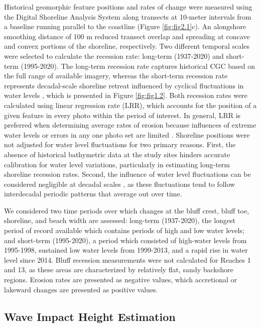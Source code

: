 Historical geomorphic feature positions and rates of change were measured using
the Digital Shoreline Analysis System
\citep[DSAS,][]{thieler2005digital,thieler2009digital,himmelstoss2021digital}
along transects at 10-meter intervals from a baseline running parallel to the
coastline (Figure \ref{fig:fig2.1}c). An alongshore smoothing distance of 100 m
reduced transect overlap and spreading at concave and convex portions of the
shoreline, respectively. Two different temporal scales were selected to
calculate the recession rate: long-term (1937-2020) and short-term (1995-2020).
The long-term recession rate captures historical CGC based on the full range of
available imagery, whereas the short-term recession rate represents
decadal-scale shoreline retreat influenced by cyclical fluctuations in water
levels , which is presented in Figure \ref{fig:fig1.2}. Both recession rates
were calculated using linear regression rate (LRR), which accounts for the
position of a given feature in every photo within the period of interest. In
general, LRR is preferred when determining average rates of erosion because
influences of extreme water levels or errors in any one photo set are limited
\citep{thieler2005digital,thieler2009digital,himmelstoss2021digital}. Shoreline
positions were not adjusted for water level fluctuations for two primary
reasons. First, the absence of historical bathymetric data at the study sites
hinders accurate calibration for water level variations, particularly in
estimating long-term shoreline recession rates.  Second, the influence of water
level fluctuations can be considered negligible at decadal scales
\citep{hanrahan2009quasi}, as these fluctuations tend to follow interdecadal
periodic patterns that average out over time.

We considered two time periods over which changes at the bluff crest, bluff toe,
shoreline, and beach width are assessed: long-term (1937-2020), the longest
period of record available which contains periods of high and low water levels;
and short-term (1995-2020), a period which consisted of high-water levels from
1995-1998, sustained low water levels from 1999-2013, and a rapid rise in water
level since 2014. Bluff recession measurements were not calculated for Reaches 1
and 13, as these areas are characterized by relatively flat, sandy backshore
regions. Erosion rates are presented as negative values, which accretional or
lakeward changes are presented as positive values. 

\subsection{Wave Impact Height Estimation} 
\label{Wave Impact Height Estimation}


